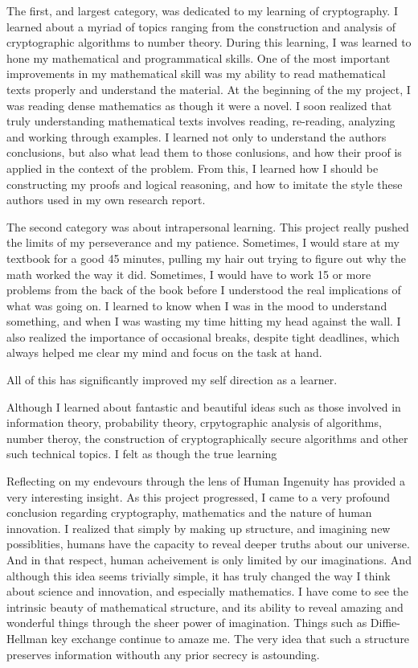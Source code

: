 \documentclass[12pt, a4paper, draft]{report}
\begin{document}
The first, and largest category, was dedicated to my learning of
cryptography. I learned about a myriad of topics ranging from
the construction and analysis of cryptographic algorithms to number
theory. During this learning, I was learned to hone my mathematical and
programmatical skills. One of the most important improvements
in my mathematical skill was my ability to read mathematical texts
properly and understand the material. At the beginning of the my project,
I was reading dense mathematics as though it were a novel. I soon realized
that truly understanding mathematical texts involves reading, re-reading,
analyzing and working through examples. I learned not only to understand
the authors conclusions, but also what lead them to those conlusions, and
how their proof is applied in the context of the problem. From this, I
learned how I should be constructing my proofs and logical reasoning, and
how to imitate the style these authors used in my own research report.

The second category was about intrapersonal learning. This project really
pushed the limits of my perseverance and my patience. Sometimes, I would
stare at my textbook for a good 45 minutes, pulling my hair out trying to
figure out why the math worked the way it did. Sometimes, I would have
to work 15 or more problems from the back of the book before I understood
the real implications of what was going on. I learned to know when I was
in the mood to understand something, and when I was wasting my time hitting
my head against the wall. I also realized the importance of occasional
breaks, despite tight deadlines, which always helped me clear my mind
and focus on the task at hand.

All of this has significantly improved my self direction as a learner.

Although
I learned about fantastic and beautiful ideas such as those involved in
information theory, probability theory, crpytographic analysis of
algorithms, number theroy, the construction of cryptographically secure
algorithms and other such technical topics. I felt as though the true
learning

Reflecting on my endevours through the lens of Human Ingenuity has
provided a very interesting insight. As this project progressed, I came
to a very profound conclusion regarding cryptography, mathematics and
the nature of human innovation. I realized that simply by making up
structure, and imagining new possiblities, humans have the capacity
to reveal deeper truths about our universe. And in that respect,
human acheivement is only limited by our imaginations. And although
this idea seems trivially simple, it has truly changed the way I think
about science and innovation, and especially mathematics. I have come
to see the intrinsic beauty of mathematical structure, and its ability
to reveal amazing and wonderful things through the sheer power of
imagination. Things such as Diffie-Hellman key exchange continue to
amaze me. The very idea that such a structure preserves information
withouth any prior secrecy is astounding.
\end{document}
